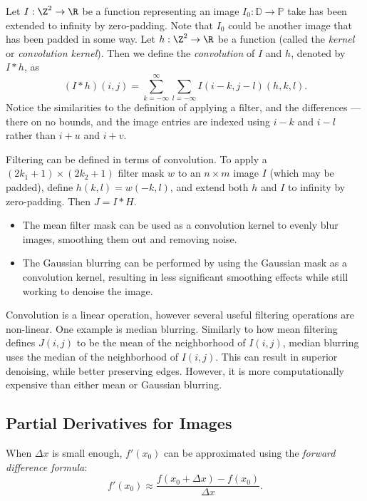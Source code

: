 \documentclass[12pt]{article}
\begin{document}
\begin{defn}
    Let $I: \Z^2 \to \R$ be a function representing an image $I_0: \mathbb{D} \to \mathbb{P}$ take has been extended to infinity by zero-padding. Note that $I_0$ could be another image that has been padded in some way. Let $h: \Z^2 \to \R$ be a function (called the \emph{kernel} or \emph{convolution kernel}). Then we define the \emph{convolution} of $I$ and $h$, denoted by $I * h$, as \[(I * h)(i, j) = \sum_{k=-\infty}^{\infty}\sum_{l=-\infty}I(i - k, j - l)(h, k, l).\] Notice the similarities to the definition of applying a filter, and the differences --- there on no bounds, and the image entries are indexed using $i - k$ and $i - l$ rather than $i + u$ and $i + v$.
\end{defn}

Filtering can be defined in terms of convolution. To apply a $(2k_1 + 1) \times (2k_2 + 1)$ filter mask $w$ to an $n \times m$ image $I$ (which may be padded), define $h(k, l) = w(-k, l)$, and extend both $h$ and $I$ to infinity by zero-padding. Then $J = I * H$.

\begin{exmp}\proofbreak
    \begin{itemize}
        \item The mean filter mask can be used as a convolution kernel to evenly blur images, smoothing them out and removing noise.
        \item The Gaussian blurring can be performed by using the Gaussian mask as a convolution kernel, resulting in less significant smoothing effects while still working to denoise the image.
    \end{itemize}
\end{exmp}

Convolution is a linear operation, however several useful filtering operations are non-linear. One example is median blurring. Similarly to how mean filtering defines $J(i, j)$ to be the mean of the neighborhood of $I(i, j)$, median blurring uses the median of the neighborhood of $I(i, j)$. This can result in superior denoising, while better preserving edges. However, it is more computationally expensive than either mean or Gaussian blurring.

\subsection{Partial Derivatives for Images}

\begin{defn}
    When $\Delta x$ is small enough, $f'(x_0)$ can be approximated using the \emph{forward difference formula}: \[f'(x_0) \approx \frac{f(x_0 + \Delta x) - f(x_0)}{\Delta x}.\]
\end{defn}
\end{document}
